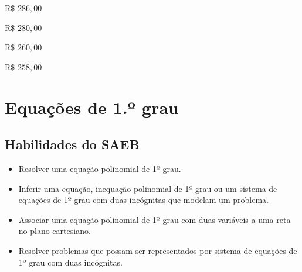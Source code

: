 \begin{escolha}
  \item R\$ $286,00$
  \item R\$ $280,00$
  \item R\$ $260,00$
  \item R\$ $258,00$
\end{escolha}


\chapter{Equações de 1.º grau}

\section{Habilidades do SAEB }
\begin{itemize}
\item Resolver uma equação polinomial de 1º grau.
\item
  Inferir uma equação, inequação polinomial de 1º grau ou um sistema de
  equações de 1º grau com duas incógnitas que modelam um problema.
\item
  Associar uma equação polinomial de 1º grau com duas variáveis a uma
  reta no plano cartesiano.
\item
  Resolver problemas que possam ser representados por sistema de
  equações de 1º grau com duas incógnitas.
\end{itemize}


